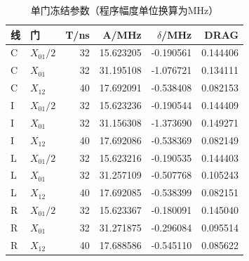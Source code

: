 \begin{table}[htbp]\centering\small
\caption{单门冻结参数（程序幅度单位换算为MHz）}\label{tab:singleparams}
\begin{tabular}{@{}llrrrr@{}}\toprule
线 & 门 & T/ns & A/MHz & $\delta$/MHz & DRAG\\\midrule
C & $X_{01}/2$ & 32 & 15.623205 & -0.190561 & 0.144406\\
C & $X_{01}$ & 32 & 31.195108 & -1.076721 & 0.134111\\
C & $X_{12}$ & 40 & 17.692091 & -0.538408 & 0.082153\\
I & $X_{01}/2$ & 32 & 15.623236 & -0.190544 & 0.144409\\
I & $X_{01}$ & 32 & 31.156308 & -1.373690 & 0.149271\\
I & $X_{12}$ & 40 & 17.692086 & -0.538369 & 0.082149\\
L & $X_{01}/2$ & 32 & 15.623216 & -0.190535 & 0.144403\\
L & $X_{01}$ & 32 & 31.257109 & -0.507768 & 0.105243\\
L & $X_{12}$ & 40 & 17.692085 & -0.538399 & 0.082151\\
R & $X_{01}/2$ & 32 & 15.623367 & -0.180091 & 0.145040\\
R & $X_{01}$ & 32 & 31.271875 & -0.296084 & 0.095514\\
R & $X_{12}$ & 40 & 17.688586 & -0.545110 & 0.085622\\
\bottomrule\end{tabular}\end{table}

